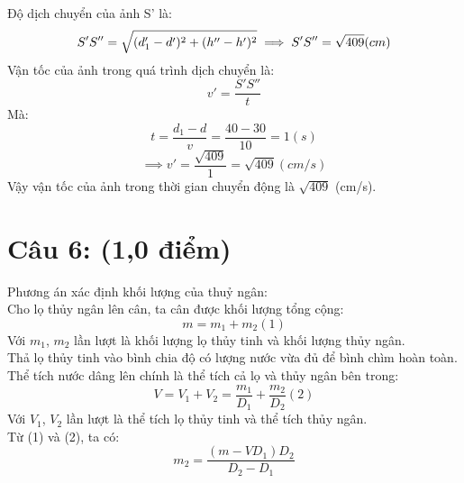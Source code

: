 \documentclass[50pt]{article}
\begin{document}
Độ dịch chuyển của ảnh S' là:\\
\begin{equation*}
    S'S'' = \sqrt{(d_{1}' - d')^2 + (h'' - h')^2}\\
    \implies S'S'' = \sqrt{409} (cm)\\
\end{equation*}
Vận tốc của ảnh trong quá trình dịch chuyển là:\\
\begin{equation*}
    v' = \dfrac{S'S''}{t}
\end{equation*}
Mà:
\begin{equation*}
    t = \dfrac{d_{1} - d}{v} = \dfrac{40 - 30}{10} = 1 (s)
\end{equation*}
\begin{equation*}
    \implies v' = \dfrac{\sqrt{409}}{1} = \sqrt{409} (cm/s)
\end{equation*}
Vậy vận tốc của ảnh trong thời gian chuyển động là $\sqrt{409}$ (cm/s).
\section*{Câu 6: (1,0 điểm)}
Phương án xác định khối lượng của thuỷ ngân:\\
Cho lọ thủy ngân lên cân, ta cân được khối lượng tổng cộng:
\begin{equation*}
    m = m_{1} + m_{2} (1)
\end{equation*}
Với $m_{1}$, $m_{2}$ lần lượt là khối lượng lọ thủy tinh và khối lượng thủy ngân.\\
Thả lọ thủy tinh vào bình chia độ có lượng nước vừa đủ để bình chìm hoàn toàn. Thể tích nước dâng lên chính là thể tích cả lọ và thủy ngân bên trong:
\begin{equation*}
    V = V_{1} + V_{2} = \dfrac{m_{1}}{D_{1}} + \dfrac{m_{2}}{D_{2}} (2)
\end{equation*}
Với $V_{1}$, $V_{2}$ lần lượt là thể tích lọ thủy tinh và thể tích thủy ngân.\\
Từ (1) và (2), ta có:\\
\begin{equation*}
    m_{2} = \dfrac{(m - VD_{1})D_{2}}{D_{2} - D_{1}}
\end{equation*}
\end{document}

